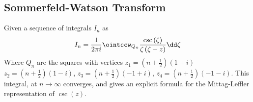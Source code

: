 \documentclass[../mmf.tex]{subfiles}
\begin{document}
\subsection{Sommerfeld-Watson Transform}
\begin{prop}
	Given a sequence of integrals $I_n$ as
	\begin{equation*}
		I_n=\frac{1}{2\pi i}\ointccw_{Q_n}\frac{\csc\left( \zeta \right)}{\zeta\left( \zeta-z \right)}\dd\zeta
	\end{equation*}
	Where $Q_n$ are the squares with vertices $z_1=\left( n+\frac{1}{2} \right)(1+i)$ $z_2=\left( n+\frac{1}{2} \right)(1-i)$, $z_3=\left( n+\frac{1}{2} \right)(-1+i)$, $z_4=\left( n+\frac{1}{2} \right)(-1-i)$.
	This integral, at $n\to\infty$ converges, and gives an explicit formula for the Mittag-Leffler representation of $\csc(z)$.
\end{prop}
\end{document}
